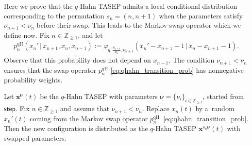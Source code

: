 Here we prove that the $q$-Hahn TASEP
admits a local conditional distribution
corresponding to the permutation $s_n=(n,n+1)$
when the parameters satisfy $\nu_{n+1}<\nu_n$ before their swap.
This leads to the Markov swap operator which we define now.
Fix $n\in \mathbb{Z}_{\ge1}$,
and let
\begin{gather}
	\label{eq:qhahn_transition_prob}
	p_n^{\mathrm{qH}}
	(x_n'\,|\, x_{n+1},x_n,x_{n-1}):=
	\varphi_{q,\frac{\nu_{n+1}}{\nu_n},\nu_{n+1}}(x_n'-x_{n+1}-1\,|\, x_n-x_{n+1}-1).
\end{gather}
Observe that this probability does not depend on $x_{n-1}$.
The condition $\nu_{n+1}<\nu_n$ ensures that
the swap operator $p_n^{\mathrm{qH}}$
\eqref{eq:qhahn_transition_prob}
has nonnegative probability weights.
\begin{Theorem}
	\label{thm:qhahn_swap}
	Let $\mathbf{x}^{\boldsymbol\nu}(t)$ be the $q$-Hahn TASEP with parameters
	$\boldsymbol\nu=\{\nu_i\}_{i\in \mathbb{Z}_{\ge1}}$,
	started from $\mathsf{step}$.
	Fix $n\in \mathbb{Z}_{\ge1}$ and assume that
	$\nu_{n+1}<\nu_n$.
	Replace $x_n(t)$ by a~random $x_n'(t)$ coming from the Markov swap operator
	$p_n^{\mathrm{qH}}$~\eqref{eq:qhahn_transition_prob}.
	Then the new configuration is distributed as the $q$-Hahn TASEP $\mathbf{x}^{s_n \boldsymbol\nu}(t)$
	with swapped parameters.
\end{Theorem}
